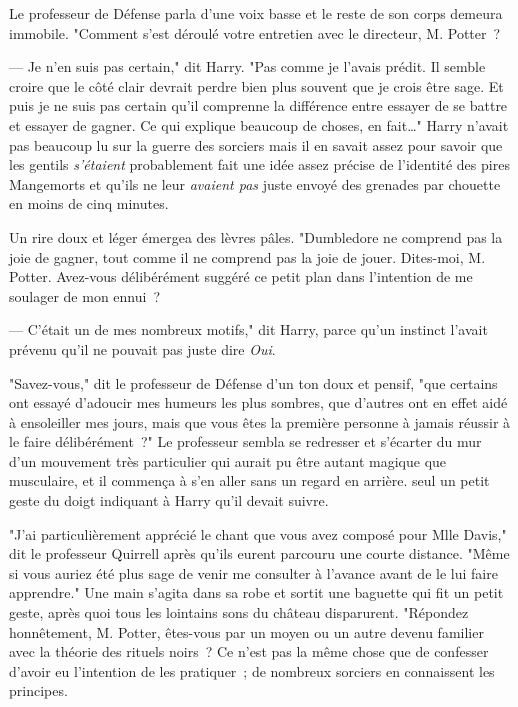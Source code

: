 Le professeur de Défense parla d'une voix basse et le reste de son corps demeura immobile. "Comment s'est déroulé votre entretien avec le directeur, M. Potter~?

--- Je n'en suis pas certain," dit Harry. "Pas comme je l'avais prédit. Il semble croire que le côté clair devrait perdre bien plus souvent que je crois être sage. Et puis je ne suis pas certain qu'il comprenne la différence entre essayer de se battre et essayer de gagner. Ce qui explique beaucoup de choses, en fait…" Harry n'avait pas beaucoup lu sur la guerre des sorciers mais il en savait assez pour savoir que les gentils \emph{s'étaient} probablement fait une idée assez précise de l'identité des pires Mangemorts et qu'ils ne leur \emph{avaient pas} juste envoyé des grenades par chouette en moins de cinq minutes.

Un rire doux et léger émergea des lèvres pâles. "Dumbledore ne comprend pas la joie de gagner, tout comme il ne comprend pas la joie de jouer. Dites-moi, M. Potter. Avez-vous délibérément suggéré ce petit plan dans l'intention de me soulager de mon ennui~?

--- C'était un de mes nombreux motifs," dit Harry, parce qu'un instinct l'avait prévenu qu'il ne pouvait pas juste dire \emph{Oui}.

"Savez-vous," dit le professeur de Défense d'un ton doux et pensif, "que certains ont essayé d'adoucir mes humeurs les plus sombres, que d'autres ont en effet aidé à ensoleiller mes jours, mais que vous êtes la première personne à jamais réussir à le faire délibérément~?" Le professeur sembla se redresser et s'écarter du mur d'un mouvement très particulier qui aurait pu être autant magique que musculaire, et il commença à s'en aller sans un regard en arrière. seul un petit geste du doigt indiquant à Harry qu'il devait suivre.

"J'ai particulièrement apprécié le chant que vous avez composé pour Mlle Davis," dit le professeur Quirrell après qu'ils eurent parcouru une courte distance. "Même si vous auriez été plus sage de venir me consulter à l'avance avant de le lui faire apprendre." Une main s'agita dans sa robe et sortit une baguette qui fit un petit geste, après quoi tous les lointains sons du château disparurent. "Répondez honnêtement, M. Potter, êtes-vous par un moyen ou un autre devenu familier avec la théorie des rituels noirs~? Ce n'est pas la même chose que de confesser d'avoir eu l'intention de les pratiquer~; de nombreux sorciers en connaissent les principes.

